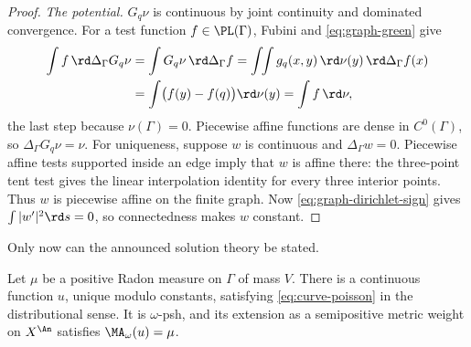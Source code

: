 \begin{proof}
\emph{The potential.}  $G_q\nu$ is continuous by joint continuity and
dominated convergence.  For a test function $f\in\PL(\Gamma)$, Fubini and
\eqref{eq:graph-green} give
\[
 \begin{aligned}
 \int f\,\rd\Delta_\Gamma G_q\nu
  &=\int G_q\nu\,\rd\Delta_\Gamma f
   =\int\!\!\int g_q(x,y)\,\rd\nu(y)\,\rd\Delta_\Gamma f(x)\\
  &=\int\bigl(f(y)-f(q)\bigr)\rd\nu(y)
   =\int f\,\rd\nu,
 \end{aligned}
\]
the last step because $\nu(\Gamma)=0$.  Piecewise affine functions are
dense in $C^0(\Gamma)$, so $\Delta_\Gamma G_q\nu=\nu$.  For uniqueness, suppose $w$ is continuous and $\Delta_\Gamma w=0$.
Piecewise affine tests supported inside an edge imply that $w$ is affine
there: the three-point tent test gives the linear interpolation identity
for every three interior points.  Thus $w$ is piecewise affine on the
finite graph.  Now \eqref{eq:graph-dirichlet-sign} gives
$\int|w'|^2\rd s=0$, so connectedness makes $w$ constant.
\end{proof}

Only now can the announced solution theory be stated.

\begin{proposition}
\label{prop:graph-ma-solution}
Let $\mu$ be a positive Radon measure on $\Gamma$ of mass $V$.
There is a continuous function $u$, unique modulo constants, satisfying
\eqref{eq:curve-poisson} in the distributional sense.  It is
$\omega$-psh, and its extension as a semipositive metric weight on
$X^{\An}$ satisfies $\MA_\omega(u)=\mu$.
\end{proposition}

